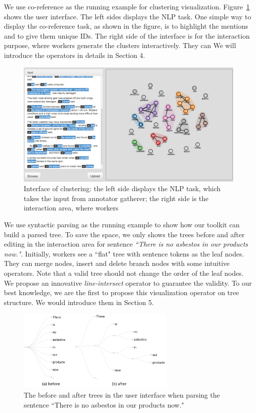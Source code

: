 We use co-reference as the running example for clustering visualization. Figure~\ref{fig:interface1.png} shows the user interface. The left sides displays the NLP task. One simple way to display the co-reference task, as shown in the figure, is to highlight the mentions and to give them unique IDs. The right side of the interface is for the interaction purpose, where workers generate the clusters interactively. They can We will introduce the operators in details in Section 4. 
\begin{figure}
\centering
\includegraphics[width=6.1in]{figs/interface1.png}
\caption{Interface of clustering: the left side displays the NLP task, which takes the input from annotator gatherer; the right side is the interaction area, where workers   }
\label{fig:interface1.png}
\end{figure}

We use syntactic parsing as the running example to show how our toolkit can build a parsed tree. To save the space, we only shows the trees before and after editing in the interaction area for sentence {\em ``There is no asbestos in our products now."}. Initially, workers see a ``flat" tree with sentence tokens as the leaf nodes. They can merge nodes, insert and delete branch nodes with some intuitive operators. Note that a valid tree should not change the order of the leaf nodes. We propose an innovative {\em line-intersect} operator to guarantee the validity. To our best knowledge, we are the first to propose this visualization operator on tree structure. We would introduce them in Section 5.

\begin{figure}
\centering
\includegraphics[width=3in]{figs/overview_tree_editing.png}
\caption{The before and after trees in the user interface when parsing the sentence {``There is no asbestos in our products now."}}
\label{fig:interface2.png}
\end{figure}


